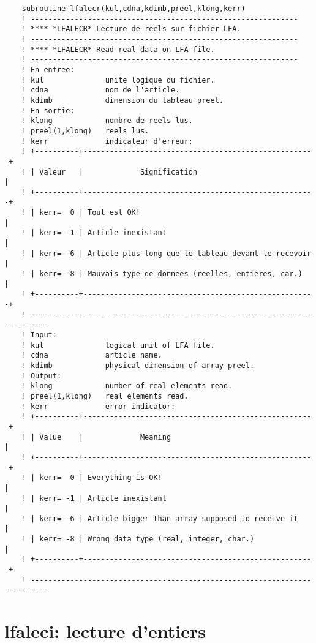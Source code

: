 \documentclass[10pt,french]{book}
\begin{document}
\begin{verbatim}
	subroutine lfalecr(kul,cdna,kdimb,preel,klong,kerr)
	! -------------------------------------------------------------                
	! **** *LFALECR* Lecture de reels sur fichier LFA.
	! -------------------------------------------------------------                
	! **** *LFALECR* Read real data on LFA file.
	! -------------------------------------------------------------                
	! En entree:
	! kul              unite logique du fichier.
	! cdna             nom de l'article.
	! kdimb            dimension du tableau preel.
	! En sortie:
	! klong            nombre de reels lus.
	! preel(1,klong)   reels lus.
	! kerr             indicateur d'erreur:
	! +----------+-----------------------------------------------------+
	! | Valeur   |             Signification                           |
	! +----------+-----------------------------------------------------+
	! | kerr=  0 | Tout est OK!                                        |
	! | kerr= -1 | Article inexistant                                  |
	! | kerr= -6 | Article plus long que le tableau devant le recevoir |
	! | kerr= -8 | Mauvais type de donnees (reelles, entieres, car.)   |
	! +----------+-----------------------------------------------------+
	! --------------------------------------------------------------------------
	! Input:
	! kul              logical unit of LFA file.
	! cdna             article name.
	! kdimb            physical dimension of array preel.
	! Output:
	! klong            number of real elements read.
	! preel(1,klong)   real elements read.
	! kerr             error indicator:
	! +----------+-----------------------------------------------------+
	! | Value    |             Meaning                                 |
	! +----------+-----------------------------------------------------+
	! | kerr=  0 | Everything is OK!                                   |
	! | kerr= -1 | Article inexistant                                  |
	! | kerr= -6 | Article bigger than array supposed to receive it    |
	! | kerr= -8 | Wrong data type (real, integer, char.)              |
	! +----------+-----------------------------------------------------+
	! --------------------------------------------------------------------------
\end{verbatim}
\section{lfaleci: lecture d'entiers}
 
 
 
\end{document}
